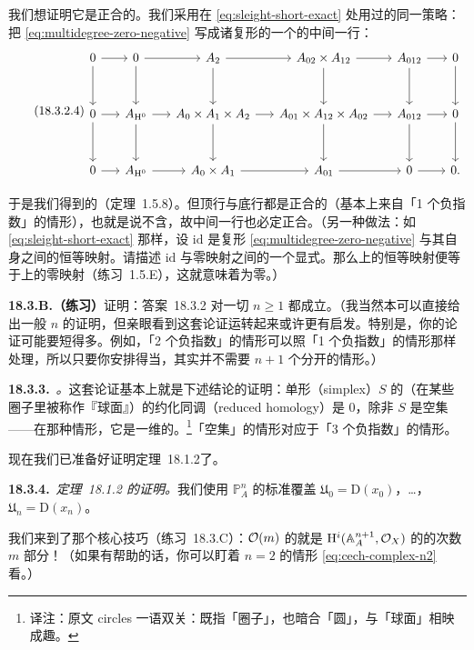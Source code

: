 我们想证明它是正合的。我们采用在 \eqref{eq:sleight-short-exact} 处用过的同一策略：把 \eqref{eq:multidegree-zero-negative} 写成诸复形的一个\trShortExactSequence{}的中间一行：
\begin{equation*}\tag{18.3.2.4}\label{eq:ses-complexes-multidegree}
\begin{tikzcd}[row sep=3.0em, column sep=1.5em]
0 \ar[r] \ar[d] & 0 \ar[r] \ar[d] & A_2 \ar[r] \ar[d] & A_{02}\times A_{12} \ar[r] \ar[d] & A_{012} \ar[r] \ar[d] & 0 \ar[d] \\
0 \ar[r] \ar[d] & A_{\mathrm{H}^0} \ar[r] \ar[d] & A_0\times A_1\times A_2 \ar[r] \ar[d] & A_{01}\times A_{12}\times A_{02} \ar[r] \ar[d] & A_{012} \ar[r] \ar[d] & 0 \ar[d] \\
0 \ar[r] & A_{\mathrm{H}^0} \ar[r] & A_0\times A_1 \ar[r] & A_{01} \ar[r] & 0 \ar[r] & 0.
\end{tikzcd}
\end{equation*}

于是我们得到\trCohomology{}的\trLongExactSequence（\mbox{定理~1.5.8}）。但顶行与底行都是正合的（基本上来自「1 个负指数」的情形），也就是说不含\trCohomology，故中间一行也必定正合。（另一种做法：如 \eqref{eq:sleight-short-exact} 那样，设 $\mathrm{id}$ 是复形 \eqref{eq:multidegree-zero-negative} 与其自身之间的恒等映射。请描述 $\mathrm{id}$ 与零映射之间的一个显式\trHomotopy。那么\trHomology{}上的恒等映射便等于\trHomology{}上的零映射（\mbox{练习~1.5.E}），这就意味着\trHomology{}为零。）

\textbf{18.3.B.（练习）}\quad 证明：\mbox{答案~18.3.2} 对一切 $n\ge 1$ 都成立。（我当然本可以直接给出一般 $n$ 的证明，但亲眼看到这套论证运转起来或许更有启发。特别是，你的论证可能要短得多。例如，「2 个负指数」的情形可以照「1 个负指数」的情形那样处理，所以只要你安排得当，其实并不需要 $n+1$ 个分开的情形。）

\textbf{18.3.3.}\ \emph{\trhRemark{}。}\quad 这套论证基本上就是下述结论的证明：单形（simplex）$S$ 的\trBoundary{}（在某些圈子里被称作『球面』）的约化同调（reduced homology）是 $0$，除非 $S$ 是空集——在那种情形，它是一维的。\footnote{译注：原文 circles 一语双关：既指「圈子」，也暗合「圆」，与「球面」相映成趣。}「空集」的情形对应于「3 个负指数」的情形。

现在我们已准备好证明\mbox{定理~18.1.2}了。

\textbf{18.3.4.}\ \emph{\mbox{定理~18.1.2} 的证明。}\quad 我们使用 $\mathbb{P}^n_A$ 的标准覆盖 $\mathfrak{U}_0=\mathrm{D}(x_0)$，…，$\mathfrak{U}_n=\mathrm{D}(x_n)$。

我们来到了那个核心技巧（\mbox{练习~18.3.C}）：$\mathcal{O}(m)$ 的\trCech\trComplexN{}就是 $\mathrm{H}^i(\mathbb{A}^{n+1}_A,\mathcal{O}_X)$ 的\trCech\trComplexN{}的次数 $m$ 部分！（如果有帮助的话，你可以盯着 $n=2$ 的情形 \eqref{eq:cech-complex-n2} 看。）

